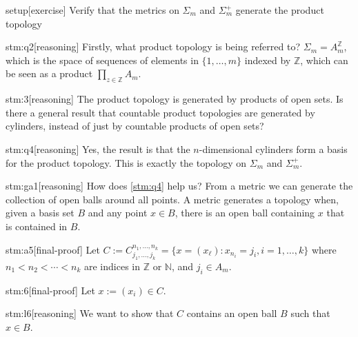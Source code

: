 
\begin{stm}{setup}[exercise]
Verify that the metrics on $\Sigma_m$ and $\Sigma_m^+$ generate the product topology
\end{stm}


\begin{stm}{stm:q2}[reasoning]
Firstly, what product topology is being referred to? $\Sigma_m = A_m^{\mathbb{Z}}$, which is the space of sequences of elements in $\{1,\ldots,m\}$ indexed by $\mathbb{Z}$, which can be seen as a product $\prod_{z \in \mathbb{Z}} A_m$.
\end{stm}

\begin{stm}{stm:3}[reasoning]
The product topology is generated by products of open sets. Is there a general result that countable product topologies are generated by cylinders, instead of just by countable products of open sets?
\end{stm}

\begin{stm}{stm:q4}[reasoning]
Yes, the result is that the $n$-dimensional cylinders form a basis for the product topology. This is exactly the topology on $\Sigma_m$ and $\Sigma_m^+$.
\end{stm}

\begin{stm}{stm:ga1}[reasoning]
How does \ref{stm:q4} help us? From a metric we can generate the collection of open balls around all points. A metric generates a topology when, given a basis set $B$ and any point $x \in B$, there is an open ball containing $x$ that is contained in $B$.
\end{stm}

\begin{stm}{stm:a5}[final-proof]
Let $C := C_{j_1,\ldots,j_k}^{n_1,\ldots,n_k} = \{ x = (x_\ell) : x_{n_i} = j_i, i=1,\ldots,k \}$ where $n_1 < n_2 < \cdots < n_k$ are indices in $\mathbb{Z}$ or $\mathbb{N}$, and $j_i \in A_m$.
\end{stm}

\begin{stm}{stm:6}[final-proof]
    Let $x := (x_i)  \in C$.
\end{stm}

\begin{stm}{stm:l6}[reasoning]
We want to show that $C$ contains an open ball $B$ such that $x \in B$.
\end{stm}

